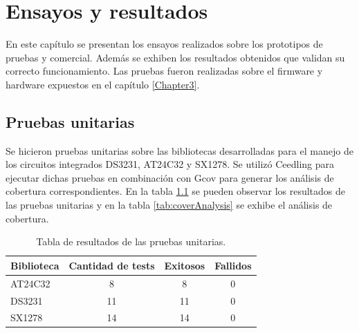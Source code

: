 
\chapter{Ensayos y resultados} %

\label{Chapter4} %



En este capítulo se presentan los ensayos realizados sobre los prototipos de pruebas y comercial. Además se exhiben los resultados obtenidos que validan su correcto funcionamiento. Las pruebas fueron realizadas sobre el firmware y hardware expuestos en el capítulo \ref{Chapter3}.


\section{Pruebas unitarias}
\label{sec:pruebasU}

Se hicieron pruebas unitarias sobre las bibliotecas desarrolladas para el manejo de los circuitos integrados DS3231, AT24C32 y SX1278. Se utilizó Ceedling para ejecutar dichas pruebas en combinación con Gcov para generar los análisis de cobertura correspondientes. En la tabla \ref{tab:resultsCeedling} se pueden observar los resultados de las pruebas unitarias y en la tabla \ref{tab:coverAnalysis} se exhibe el análisis de cobertura.

\begin{table}[h]
	\centering
	\caption[Pruebas unitarias]{Tabla de resultados de las pruebas unitarias.}
	\begin{tabular}{l c c c}    
		\toprule
		\textbf{Biblioteca} & \textbf{Cantidad de tests} & \textbf{Exitosos} & \textbf{Fallidos}  \\
		\midrule
		AT24C32 & 8	& 8 & 0 \\		
		DS3231 & 11 & 11 & 0 \\
		SX1278 & 14 & 14 & 0 \\
		\bottomrule
		\hline
	\end{tabular}
	\label{tab:resultsCeedling}
\end{table}

